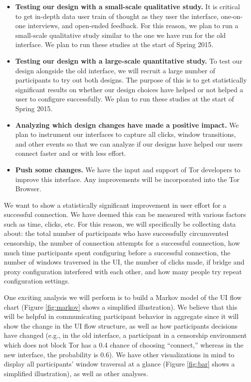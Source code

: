 \documentclass{template}
\begin{document}
\begin{itemize} \itemsep1pt \parskip0pt  
\item {\bfseries Testing our design with a small-scale qualitative study.} It is critical to get in-depth data user train of thought as they user the interface, one-on-one interviews, and open-ended feedback. For this reason, we plan to run a small-scale qualitative study similar to the one we have run for the old interface. We plan to run these studies at the start of Spring 2015. 
\item {\bfseries Testing our design with a large-scale quantitative study.} To test our design alongside the old interface, we will recruit a large number of participants to try out both designs. The purpose of this is to get statistically significant results on whether our design choices have helped or not helped a user to configure successfully. We plan to run these studies at the start of Spring 2015.
\item {\bfseries Analyzing which design changes have made a positive impact.} We plan to instrument our interfaces to capture all clicks, window transitions, and other events so that we can analyze if our designs have helped our users connect faster and or with less effort. 
\item {\bfseries Push some changes.} We have the input and support of Tor developers
to improve this interface. Any improvements will be incorporated into the Tor Browser.
\end{itemize}

 We want to show a statistically significant improvement in user effort for a successful connection. We have deemed this can be measured with various factors such as time, clicks, etc. For this reason, we will specifically be collecting data about: the total number of participants who have successfully circumvented censorship, the number of connection attempts for a successful connection, how much time participants spent configuring before a successful connection, the number of windows traversed in the UI, the number of clicks made, if bridge and proxy configuration interfered with each other, and how many people try repeat configuration settings. 

One exciting analysis we will perform is to build a Markov model of the UI flow chart (Figure \ref{fig:markov} shows a simplified illustration). We believe that this will be helpful in communicating participant behavior in aggregate since it will show the change in the UI flow structure, as well as how participants decisions have changed (e.g., in the old interface, a participant in a censorship environment which does not block Tor has a 0.4 chance of choosing ``connect,'' whereas in the new interface, the probability is 0.6). We have other visualizations in mind to display all participants' window traversal at a glance (Figure \ref{fig:bar} shows a simplified illustration), as well as other analyses.\\
\end{document}
